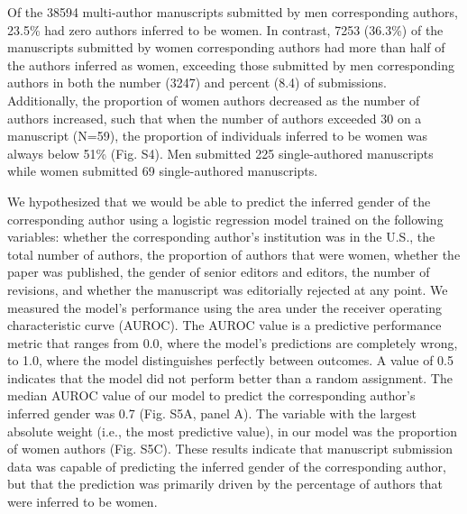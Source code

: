 \documentclass[11pt,]{article}
\begin{document}
Of the 38594 multi-author manuscripts submitted by men corresponding
authors, 23.5\% had zero authors inferred to be women. In contrast, 7253
(36.3\%) of the manuscripts submitted by women corresponding authors had
more than half of the authors inferred as women, exceeding those
submitted by men corresponding authors in both the number (3247) and
percent (8.4) of submissions. Additionally, the proportion of women
authors decreased as the number of authors increased, such that when the
number of authors exceeded 30 on a manuscript (N=59), the proportion of
individuals inferred to be women was always below 51\% (Fig. S4). Men
submitted 225 single-authored manuscripts while women submitted 69
single-authored manuscripts.

We hypothesized that we would be able to predict the inferred gender of
the corresponding author using a logistic regression model trained on
the following variables: whether the corresponding author's institution
was in the U.S., the total number of authors, the proportion of authors
that were women, whether the paper was published, the gender of senior
editors and editors, the number of revisions, and whether the manuscript
was editorially rejected at any point. We measured the model's
performance using the area under the receiver operating characteristic
curve (AUROC). The AUROC value is a predictive performance metric that
ranges from 0.0, where the model's predictions are completely wrong, to
1.0, where the model distinguishes perfectly between outcomes. A value
of 0.5 indicates that the model did not perform better than a random
assignment. The median AUROC value of our model to predict the
corresponding author's inferred gender was 0.7 (Fig. S5A, panel A). The
variable with the largest absolute weight (i.e., the most predictive
value), in our model was the proportion of women authors (Fig. S5C).
These results indicate that manuscript submission data was capable of
predicting the inferred gender of the corresponding author, but that the
prediction was primarily driven by the percentage of authors that were
inferred to be women.
\end{document}
